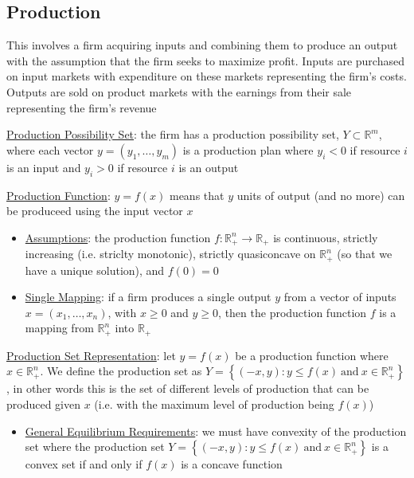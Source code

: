 \documentclass{article}
\begin{document}
\subsection{Production}
This involves a firm acquiring inputs and combining them to produce an output with the assumption that the firm seeks to maximize profit. Inputs are purchased on input markets with expenditure on these markets representing the firm's costs. Outputs are sold on product markets with the earnings from their sale representing the firm's revenue \par \vspace{0.3em}
  \underline{Production Possibility Set}: the firm has a production possibility set, $Y \subset \mathbb{R}^{m}$, where each vector $y = (y_{1}, \dots, y_{m})$ is a production plan where $y_{i} < 0$ if resource $i$ is an input and $y_{i} > 0$ if resource $i$ is an output
  \par
  \underline{Production Function}: $y = f(x)$ means that $y$ units of output (and no more) can be produceed using the input vector $x$
  \begin{itemize}
    \item  \underline{Assumptions}: the production function $f: \mathbb{R}_{+}^{n} \rightarrow \mathbb{R}_{+}$ is continuous, strictly increasing (i.e. striclty monotonic), strictly quasiconcave on $\mathbb{R}_{+}^{n}$ (so that we have a unique solution), and $f(0) = 0$
    \item  \underline{Single Mapping}: if a firm produces a single output $y$ from a vector of inputs $x = (x_{1}, \dots, x_{n})$, with $x \geq 0$ and $y \geq 0$, then the production function $f$ is a mapping from $\mathbb{R}_{+}^{n}$ into $\mathbb{R}_{+}$
  \end{itemize}
  \par
  \underline{Production Set Representation}: let $y = f(x)$ be a production function where $x \in \mathbb{R}_{+}^{n}$. We define the production set as $Y = \left\{ (-x, y): y \leq f(x) \ \text{and} \ x \in \mathbb{R}_{+}^{n} \right\}$, in other words this is the set of different levels of production that can be produced given $x$ (i.e. with the maximum level of production being $f(x)$)
  \begin{itemize}
    \item  \underline{General Equilibrium Requirements}: we must have convexity of the production set where the production set $Y = \left\{ (-x, y): y \leq f(x) \ \text{and} \ x \in \mathbb{R}_{+}^{n} \right\}$ is a convex set if and only if $f(x)$ is a concave function
  \end{itemize}
\end{document}
